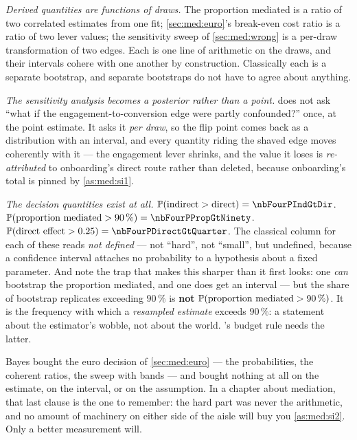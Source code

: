 \emph{Derived quantities are functions of draws.} The proportion mediated is a ratio of two
correlated estimates from one fit; \cref{sec:med:euro}'s break-even cost ratio is a ratio of two
lever values; the sensitivity sweep of \cref{sec:med:wrong} is a per-draw transformation of two
edges. Each is one line of arithmetic on the draws, and their intervals cohere with one another by
construction. Classically each is a separate bootstrap, and separate bootstraps do not have to agree
about anything.

\emph{The sensitivity analysis becomes a posterior rather than a point.}  does
not ask ``what if the engagement-to-conversion edge were partly confounded?'' once, at the point
estimate. It asks it \emph{per draw}, so the flip point comes back as a distribution with an
interval, and every quantity riding the shaved edge moves coherently with it --- the engagement lever
shrinks, and the value it loses is \emph{re-attributed} to onboarding's direct route rather than
deleted, because onboarding's total is pinned by \cref{as:med:si1}.

\emph{The decision quantities exist at all.} $\Prob(\text{indirect} > \text{direct}) =
\nbFourPIndGtDir$. $\Prob(\text{proportion mediated} > 90\,\%) = \nbFourPPropGtNinety$.
$\Prob(\text{direct effect} > 0.25) = \nbFourPDirectGtQuarter$. The classical column for each of these
reads \emph{not defined} --- not ``hard'', not ``small'', but undefined, because a confidence
interval attaches no probability to a hypothesis about a fixed parameter. And note the trap that
makes this sharper than it first looks: one \emph{can} bootstrap the proportion mediated, and one
does get an interval --- but the share of bootstrap replicates exceeding $90\,\%$ is \textbf{not}
$\operatorname{\mathbb{P}}(\text{proportion mediated} > 90\,\%)$. It is the frequency with which a \emph{resampled
estimate} exceeds $90\,\%$: a statement about the estimator's wobble, not about the world.
's budget rule needs the latter.

\begin{remark}
Bayes bought the euro decision of \cref{sec:med:euro} --- the probabilities, the coherent ratios,
the sweep with bands --- and bought nothing at all on the estimate, on the interval, or on the
assumption. In a chapter about mediation, that last clause is the one to remember: the hard part was
never the arithmetic, and no amount of machinery on either side of the aisle will buy you
\cref{as:med:si2}. Only a better measurement will.
\end{remark}


